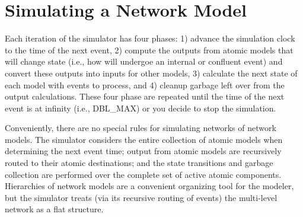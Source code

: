 \section{Simulating a Network Model}
Each iteration of the simulator has four phases: 1) advance the simulation clock to the time of the next event, 2) compute the outputs from atomic models that will change state (i.e., how will undergoe an internal or confluent event) and convert these outputs into inputs for other models, 3) calculate the next state of each model with events to process, and 4) cleanup garbage left over from the output calculations. These four phase are repeated until the time of the next event is at infinity (i.e., DBL\_MAX) or you decide to stop the simulation. 

Conveniently, there are no special rules for simulating networks of network models. The simulator considers the entire collection of atomic models when determining the next event time; output from atomic models are recursively routed to their atomic destinations; and the state transitions and garbage collection are performed over the complete set of active atomic components. Hierarchies of network models are a convenient organizing tool for the modeler, but the simulator treats (via its recursive routing of events) the multi-level network as a flat structure.

